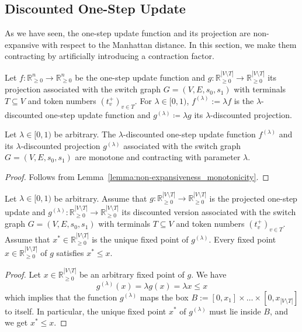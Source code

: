 \documentclass[a4paper,UKenglish,cleveref, autoref, thm-restate]{lipics-v2021}
\newcommand{\R}{\mathbb{R}}
\begin{document}
\subsection{Discounted One-Step Update}
\label{ssec:discounted_one-step_update}

As we have seen, the one-step update function and its projection are non-expansive with respect to the Manhattan distance. In this section, we make them contracting by artificially introducing a contraction factor. 

\begin{definition}
    Let $f : \R^n_{\geq 0} \rightarrow \R^n_{\geq 0}$ be the one-step update function and $g : \R^{|V \setminus T|}_{\geq 0} \rightarrow \R^{|V \setminus T|}_{\geq 0}$ its projection associated with the switch graph $G = (V, E, s_0, s_1)$ with terminals $T \subseteq V$ and token numbers $(t^+_v)_{v \in T}$. For $\lambda \in [0, 1)$, $f^{(\lambda)} := \lambda f$ is the $\lambda$-discounted one-step update function and $g^{(\lambda)} \coloneqq \lambda g$ its $\lambda$-discounted projection.
\end{definition}

\begin{corollary}
    Let $\lambda \in [0, 1)$ be arbitrary. The $\lambda$-discounted one-step update function $f^{(\lambda)}$ and its $\lambda$-discounted projection $g^{(\lambda)}$ associated with the switch graph $G = (V, E, s_0, s_1)$ are monotone and contracting with parameter $\lambda$.
\end{corollary}
\begin{proof}
    Follows from Lemma~\ref{lemma:non-expansiveness_monotonicity}.
\end{proof}

\begin{lemma}
\label{lemma:unique_fixed_point_meaning}
    Let $\lambda \in [0, 1)$ be arbitrary. Assume that $g : \R^{|V \setminus T|}_{\geq 0} \rightarrow \R^{|V \setminus T|}_{\geq 0}$ is the projected one-step update and $g^{(\lambda)} : \R^{|V \setminus T|}_{\geq 0} \rightarrow \R^{|V \setminus T|}_{\geq 0}$ its discounted version associated with the switch graph $G = (V, E, s_0, s_1)$ with terminals $T \subseteq V$ and token numbers $(t^+_v)_{v \in T}$. Assume that $x^* \in \R^{|V \setminus T|}_{\geq 0}$ is the unique fixed point of $g^{(\lambda)}$. Every fixed point $x \in \R^{|V \setminus T|}_{\geq 0}$ of $g$ satisfies $x^* \leq x$. 
\end{lemma}
\begin{proof}
    Let $x \in \R^{|V \setminus T|}_{\geq 0}$ be an arbitrary fixed point of $g$. 
    We have 
    \[
        g^{(\lambda)}(x) = \lambda g(x) = \lambda x \leq x
    \]
    which implies that the function $g^{(\lambda)}$ maps the box $B := [0, x_1] \times \dots \times  [0, x_{|V \setminus T|}]$ to itself. In particular, the unique fixed point $x^*$ of $g^{(\lambda)}$ must lie inside $B$, and we get $x^* \leq x$. 
\end{proof}
\end{document}
